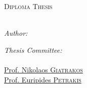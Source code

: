\documentclass[
	12pt, %
	twoside,
	english,
	onehalfspacing, %
	liststotoc, %
	toctotoc, %
	parskip, %
	headsepline, %
	chapterinoneline, %
]{MastersDoctoralThesis} %
\author{Kyriakos \textsc{Chalvatzis}} %
\begin{document}
\frontmatter %

\pagestyle{plain} %

\begin{titlepage}
	\begin{center}
		{\scshape\LARGE \univname\par}
		\vspace{0.5cm} %
		\textsc{\Large Diploma Thesis}\\[0.5cm] %

		\HRule\\[0.4cm] %
		{\huge \bfseries \ttitle\par}\vspace{0.4cm} %

		\begin{minipage}[t]{0.4\textwidth}
			\begin{flushleft} \large
				\emph{Author:}\\
				\href{http://example.com/}{\authorname} %
			\end{flushleft}
		\end{minipage}
		\begin{minipage}[t]{0.5\textwidth}
			\begin{flushright} \large
				\emph{Thesis Committee:} \\
				\href{https://www.ece.tuc.gr/el/index.php?id=4109&tx_tuclabspersonnel_list%5Bperson%5D=361&tx_tuclabspersonnel_list%5Baction%5D=person&tx_tuclabspersonnel_list%5Bcontroller%5D=List}{\supname}\\ %
				\href{https://www.ece.tuc.gr/el/i-scholi/prosopiko/single-display-person?tx_tuclabspersonnel_pi3%5Bpersonid%5D=771&cHash=7632eaf07b3963f9d990de818bdbcda9}{Prof. Nikolaos \textsc{Giatrakos}}\\
				\href{https://www.ece.tuc.gr/el/index.php?id=4109&tx_tuclabspersonnel_list%5Bperson%5D=353&tx_tuclabspersonnel_list%5Baction%5D=person&tx_tuclabspersonnel_list%5Bcontroller%5D=List}{Prof. Euripides \textsc{Petrakis}}
			\end{flushright}
		\end{minipage}\\[0.2cm]


\end{center}
\end{titlepage}
\end{document}
